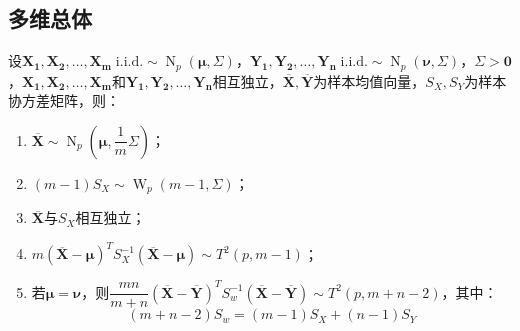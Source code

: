 \subsection{多维总体}
\begin{theorem}\label{theo:MultiVariateSamplingDist}
	设$\mathbf{X_1},\mathbf{X_2},\dots,\mathbf{X_m}\;\text{i.i.d.}\sim\operatorname{N}_p(\boldsymbol{\mu},\Sigma)$，$\mathbf{Y_1},\mathbf{Y_2},\dots,\mathbf{Y_n}\;\text{i.i.d.}\sim \operatorname{N}_p(\boldsymbol{\nu},\Sigma)$，$\Sigma>\mathbf{0}$，$\mathbf{X_1},\mathbf{X_2},\dots,\mathbf{X_m}$和$\mathbf{Y_1},\mathbf{Y_2},\dots,\mathbf{Y_n}$相互独立，$\overline{\mathbf{X}},\overline{\mathbf{Y}}$为样本均值向量，$S_X,S_Y$为样本协方差矩阵，则：
	\begin{enumerate}
		\item $\overline{\mathbf{X}}\sim\operatorname{N}_p\left(\boldsymbol{\mu},\dfrac{1}{m}\Sigma\right)$；
		\item $(m-1)S_X\sim\operatorname{W}_p(m-1,\Sigma)$；
		\item $\overline{\mathbf{X}}$与$S_X$相互独立；
		\item $m(\overline{\mathbf{X}}-\boldsymbol{\mu})^TS_X^{-1}(\overline{\mathbf{X}}-\boldsymbol{\mu})\sim T^2(p,m-1)$；
		\item 若$\boldsymbol{\mu}=\boldsymbol{\nu}$，则$\dfrac{mn}{m+n}(\overline{\mathbf{X}}-\overline{\mathbf{Y}})^TS_{w}^{-1}(\overline{\mathbf{X}}-\overline{\mathbf{Y}})\sim T^2(p,m+n-2)$，其中：
		\begin{equation*}
			(m+n-2)S_w=(m-1)S_X+(n-1)S_Y 
		\end{equation*}
	\end{enumerate}
\end{theorem}
